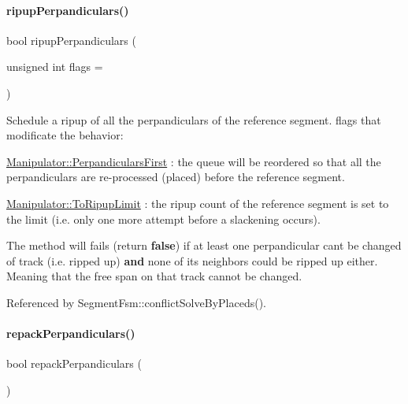 \mbox{\label{classKite_1_1Manipulator_a147c24aa53f561c10d5d24b82b03448a}} 
\paragraph{\texorpdfstring{ripup\+Perpandiculars()}{ripupPerpandiculars()}}
{\footnotesize\ttfamily bool ripup\+Perpandiculars (\begin{DoxyParamCaption}\item[{unsigned int}]{flags = {} }\end{DoxyParamCaption})}

Schedule a ripup of all the perpandiculars of the reference segment. {\ttfamily flags} that modificate the behavior\+:
\begin{DoxyItemize}
\item \mbox{\hyperlink{classKite_1_1Manipulator_a2af2ad6b6441614038caf59d04b3b217acdaeb48fa352f2898aa225b618ca26d4}{Manipulator\+::\+Perpandiculars\+First}} \+: the queue will be reordered so that all the perpandiculars are re-\/processed (placed) before the reference segment.
\item \mbox{\hyperlink{classKite_1_1Manipulator_a2af2ad6b6441614038caf59d04b3b217a6c00c46010d69247a3edc18b70d700fa}{Manipulator\+::\+To\+Ripup\+Limit}} \+: the ripup count of the reference segment is set to the limit (i.\+e. only one more attempt before a slackening occurs).
\end{DoxyItemize}

The method will fails (return {\bfseries false}) if at least one perpandicular can\textquotesingle{}t be changed of track (i.\+e. ripped up) {\bfseries and} none of it\textquotesingle{}s neighbors could be ripped up either. Meaning that the free span on that track cannot be changed. 

Referenced by Segment\+Fsm\+::conflict\+Solve\+By\+Placeds().

\mbox{\label{classKite_1_1Manipulator_a9721ea909a9b11297dea855e1ba82a55}} 
\paragraph{\texorpdfstring{repack\+Perpandiculars()}{repackPerpandiculars()}}
{\footnotesize\ttfamily bool repack\+Perpandiculars (\begin{DoxyParamCaption}{ }\end{DoxyParamCaption})}

